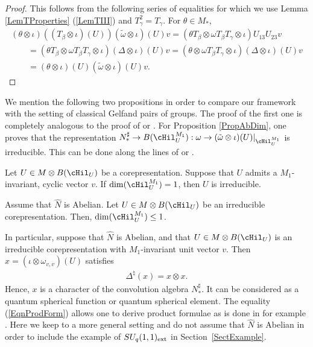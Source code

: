 \begin{proof}
 This follows from the following series of equalities for which we use Lemma \ref{LemTProperties} (\ref{LemTIII}) and $T_\gamma^2 = T_\gamma$. For $\theta \in M_\ast$,
 \begin{gather*}
  (\theta \otimes \iota)((T_\beta \otimes \iota)(U))(\tilde{\omega} \otimes \iota)(U)v = (\theta  T_\beta \otimes \omega  T_\beta T_\gamma \otimes \iota) U_{13} U_{23} v  \\
    \qquad{}
=   (\theta  T_\beta \otimes \omega T_\beta T_\gamma \otimes \iota) (\Delta \otimes \iota)(U) v
=
(\theta  \otimes \omega T_\beta T_\gamma \otimes \iota) (\Delta \otimes \iota)(U) v\\
\qquad{}
= (\theta \otimes \iota)(U) (\tilde{\omega} \otimes \iota)(U)v.\tag*{\qed}
 \end{gather*}
 \renewcommand{\qed}{}
\end{proof}



We mention the following two propositions in order to compare our framework with the setting of classical Gelfand pairs of groups. The proof of the f\/irst one is completely analogous to the proof of \cite[Proposition II.6]{Far} or \cite[Lemma 6.2.3]{Dij}. For Proposition \ref{PropAbDim}, one proves that the  representation $N_\ast^\sharp \rightarrow B(\cHil_U^{M_1}): \omega \rightarrow (\tilde{\omega} \otimes \iota)(U)\vert_{\cHil_U^{M_1}}$ is irreducible. This can be done along the lines of \cite[Th\'eor\`eme III.1]{Far} or \cite[Proposition 6.31]{Dij}.

\begin{prop}
 Let $U \in M \otimes B(\cHil_U)$ be a corepresentation. Suppose that $U$ admits a $M_1$-invariant, cyclic vector $v$. If $\dim(\cHil_U^{M_1}) = 1$, then $U$ is irreducible.
\end{prop}


\begin{prop}\label{PropAbDim}
Assume that $\hat{N}$ is Abelian. Let $U \in M \otimes B(\cHil_U)$ be an irreducible   corepresentation. Then, $\dim(\cHil_U^{M_1}) \leq 1$.
\end{prop}


In particular, suppose that  $\hat{N}$ is Abelian, and that $U \in M \otimes B(\cHil_U)$ is an irreducible corepresentation with $M_1$-invariant unit vector $v$. Then $x = (\iota \otimes \omega_{v,v})(U)$ satisf\/ies
\begin{gather}\label{EqnProdForm}
\Delta^\natural(x) = x \otimes x.
\end{gather}
Hence, $x$ is a character of the convolution algebra $N_\ast^\sharp$. It can be considered as a quantum spherical function or quantum spherical element. The equality (\ref{EqnProdForm}) allows one to derive product formulae as is done in for example \cite{VaiE2, VaiGel,VaiHyp}. Here we keep to a more general setting and do not assume that $\hat{N}$ is Abelian in order to include the example of $SU_q(1,1)_{{\rm ext}}$ in Section~\ref{SectExample}.

